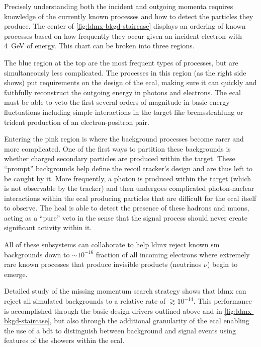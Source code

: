 Precisely understanding both the incident and outgoing momenta requires knowledge of the currently
known processes and how to detect the particles they produce. The center of
\cref{fig:ldmx-bkgd-staircase} displays an ordering of known processes based on how frequently they
occur given an incident electron with \qty{4}{\giga\electronvolt} of energy. This chart can be
broken into three regions.

The blue region at the top are the most frequent types of processes, but are simultaneously less
complicated. The processes in this region (as the right side shows) put requirements on the design
of the \ac{ecal}, making sure it can quickly and faithfully reconstruct the outgoing energy in photons
and electrons.
The \ac{ecal} must be able to veto the first several orders of magnitude in basic energy fluctuations
including simple interactions in the target like bremsstrahlung or trident production of an
electron-positron pair.

Entering the pink region is where the background processes become rarer and more complicated. One
of the first ways to partition these backgrounds is whether charged secondary particles are
produced within the target. These ``prompt'' backgrounds help define the recoil tracker's design
and are thus left to be caught by it. More frequently, a photon is produced within the target
(which is not observable by the tracker) and then undergoes complicated photon-nuclear interactions
within the \ac{ecal} producing particles that are difficult for the \ac{ecal} itself to observe.
The \ac{hcal} is able to detect the presence of these hadrons and muons, acting as a ``pure'' veto
in the sense that the signal process should never create significant activity within it.

All of these subsystems can collaborate to help \ac{ldmx} reject known \ac{sm} backgrounds down to
$\sim 10^{-16}$ fraction of all incoming electrons where extremely rare known processes that
produce invisible products (neutrinos $\nu$) begin to emerge.

Detailed study of the missing momentum search
strategy\cite{ldmx-whitepaper,ldmx-photon-reject-2020,ldmx-8gev-2023} shows that \ac{ldmx} can
reject all simulated backgrounds to a relative rate of $\gtrsim 10^{-14}$. This performance is
accomplished through the basic design drivers outlined above and in \cref{fig:ldmx-bkgd-staircase},
but also through the additional granularity of the \ac{ecal} enabling the use of a \ac{bdt} to
distinguish between background and signal events using features of the showers within the
\ac{ecal}.

